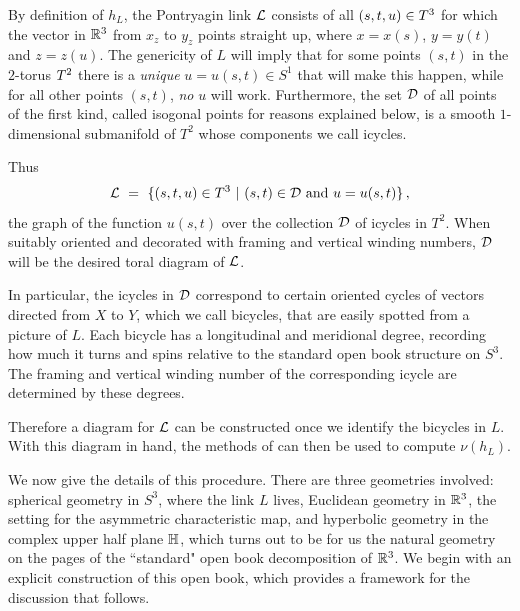 By definition of $h_L$, the Pontryagin link $\mathcal L$ consists of all $(s,t,u)\in T^3$ for which the vector in $\mathbb R^3$ from $x_z$ to $y_z$ points straight up, where $x=x(s)$, $y=y(t)$ and $z=z(u)$.   The genericity of $L$ will imply that for some points $(s,t)$ in the $2$-torus $T^2$ there is a {\it unique} $u = u(s,t)\in S^1$ that will make this happen, while for all other points $(s,t)$, {\it no} $u$ will work.  Furthermore, the set $\mathcal D$ of all points of the first kind, called {\itb isogonal points} for reasons explained below, is a smooth $1$-dimensional  submanifold of $T^2$ whose components we call {\itb icycles}.  

Thus 
$$
\mathcal L \ = \ \{(s,t,u)\in T^3 \ | \  (s,t)\in\mathcal D \text{ and } u=u(s,t)\}\,,
$$
the graph of the function $u(s,t)$ over the collection $\mathcal D$ of icycles in $T^2$.   When suitably oriented and decorated with framing and vertical winding numbers, $\mathcal D$ will be the desired toral diagram of $\mathcal L$.  


In particular, the icycles in $\mathcal D$ correspond to certain oriented cycles of vectors directed from $X$ to $Y$, which we call {\itb bicycles}, that are easily spotted from a picture of $L$.  Each bicycle has a {\itb longitudinal} and {\itb meridional degree}, recording how much it turns and spins relative to the standard open book structure on $S^3$.  The framing and vertical winding number of the corresponding icycle are determined by these degrees. 

Therefore a diagram for $\mathcal L$ can be constructed once we identify the bicycles in $L$.  With this diagram in hand, the methods of  can then be used to compute $\nu(h_L)$.

We now give the details of this procedure.  There are three 
geometries involved: spherical geometry in $S^3$,  where the link  $L$ lives, Euclidean geometry in $\mathbb R^3$,  the setting for the asymmetric characteristic map, and hyperbolic geometry in the complex upper half plane $\mathbb H$,  which turns out to be for us the natural geometry on the pages of the ``standard" open book decomposition of $\mathbb R^3$.  We begin with an explicit construction of this open book, which provides a framework for the discussion that follows.  

